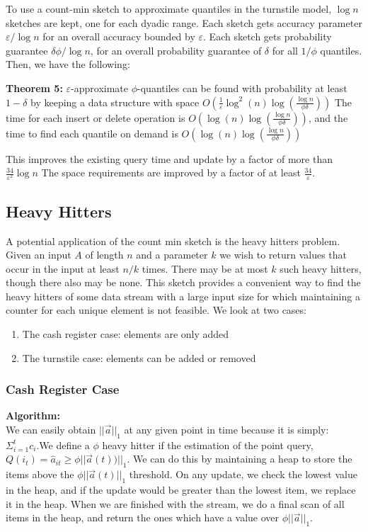 \documentclass[11pt]{article}
\begin{document}
{To use a count-min sketch to approximate quantiles in the turnstile model, $\log n$ sketches are kept,
one for each dyadic range. Each sketch gets accuracy parameter $\varepsilon/\log n$ for an overall accuracy
bounded by $\varepsilon$. Each sketch gets probability guarantee $\delta\phi/\log n$, for
an overall probability guarantee of $\delta$ for all $1/\phi$ quantiles. Then, we have the following:

\textbf{Theorem 5:} $\varepsilon$-approximate $\phi$-quantiles can be found with probability at least
$1 - \delta$ by keeping a data structure with space $O\left(\frac{1}{\varepsilon}
\log^2(n) \log \left(\frac{\log n}{\phi \delta}\right)\right)$ The time for each insert or delete operation is
$O\left(\log(n) \log \left(\frac{\log n}{\phi \delta}\right)\right)$, and the time to find each quantile on demand 
is $O\left(\log(n)\log\left(\frac{\log n}{\phi \delta}\right)\right)$

This improves the existing query time and update by a factor of more than $\frac{34}{\varepsilon^2} \log n$
The space requirements are improved by a factor of at least $\frac{34}{\varepsilon}$. 

\subsection{Heavy Hitters}
A potential application of the count min sketch is the heavy hitters problem. Given an input $A$ of length $n$ and a parameter $k$ we wish to return values that occur in the input at least $n/k$ times. There may be at most $k$ such heavy hitters, though there also may be none. This sketch provides a convenient way to find the heavy hitters of some data stream with a large input size for which  maintaining a counter for each unique element is not feasible. We look at two cases:
\begin{enumerate}
\item The cash register case: elements are only added
\item The turnstile case: elements can be added or removed
\end{enumerate}

\subsubsection{Cash Register Case}
\textbf{Algorithm:}\\
We can easily obtain $||\vec{a}||_1$ at any given point in time because it is
simply: $\Sigma_{i=1}^t c_i$.We define a $\phi$ heavy hitter if the estimation
of the point query, $Q(i_t) =  \hat a_{it} \geq \phi ||\vec{a}(t))||_1$. We can
do this by maintaining a heap to store the items above the
$\phi||\vec{a}(t)||_1$ threshold. On any update, we check the lowest value
in the heap, and if the update would be greater than the lowest item, we
replace it in the heap. When we are finished with the stream, we do a final
scan of all items in the heap, and return the ones which have a value over
$\phi||\vec{a}||_1$.

}
\end{document}
